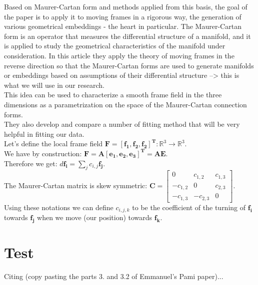 Based on Maurer-Cartan form and methods applied from this basis, the goal of the paper is to apply it to moving frames in a rigorous way, the generation of various geometrical embeddings - the heart in particular. The Maurer-Cartan form is an operator that measures the differential structure of a manifold, and it is applied to study the geometrical characteristics  of the manifold under consideration. In this article they apply the theory of moving frames in the reverse direction so that the Maurer-Cartan forms are used to generate manifolds or embeddings based on assumptions of their differential structure --> this is what we will use in our research.\\
This idea can be used to characterize a smooth frame field in the three dimensions as a parametrization on the space of the Maurer-Cartan connection forms.\\
They also develop and compare a number of fitting method that will be very helpful in fitting our data.\\
Let's define the local frame field $\mathbf{F = [f_1 , f_2 , f_2]^T} : \mathbb{R}^3 \to \mathbb{R}^3$.\\
We have by construction: $\mathbf{F = A[e_1 , e_2 , e_3]^T = AE}$.\\
Therefore we get: $d \mathbf{f_i} = \sum_j c_{i,j}\mathbf{f_j}$.\\
The Maurer-Cartan matrix is skew symmetric: $\mathbf{C} = \begin{bmatrix}0 & c_{1,2} & c_{1,3} \\ -c_{1,2} & 0 & c_{2,3} \\ -c_{1,3} & -c_{2,3} & 0
\end{bmatrix}$.\\
Using these notations we can define $c_{i,j,k}$ to be the coefficient of the turning of $\mathbf{f_i}$ towards $\mathbf{f_j}$ when we move (our position) towards $\mathbf{f_k}$.\\

\section{Test}

Citing (copy pasting the parts 3. and 3.2 of Emmanuel's Pami paper)...

